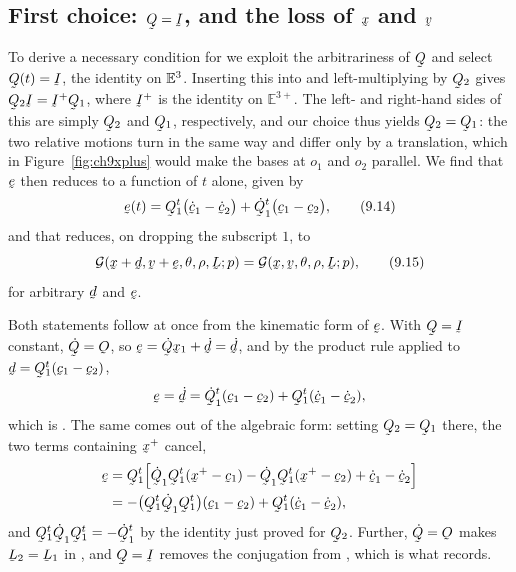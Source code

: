 \subsection*{First choice: $\bQ=\I$, and the loss of $\bx$ and $\bv$}

To derive a necessary condition for  we exploit the
arbitrariness of $\bQ$ and select $\bQ(t)=\I$, the identity on $\mathbb{E}^{3}$.
Inserting this into  and left-multiplying by $\bQ_{2}$ gives
$\bQ_{2}\I=\I^{+}\bQ_{1}$, where $\I^{+}$ is the identity on
$\mathbb{E}^{3+}$. The left- and right-hand sides of this are simply
$\bQ_{2}$ and $\bQ_{1}$, respectively, and our choice thus yields
$\bQ_{2}=\bQ_{1}$: the two relative motions turn in the same way and
differ only by a translation, which in Figure~\ref{fig:ch9xplus} would
make the bases at $o_{1}$ and $o_{2}$ parallel. We find that $\be$ then
reduces to a function of $t$ alone, given by
\begin{equation}
   \be(t)=\bQ_{1}^{t}\big(\dot\bc_{1}-\dot\bc_{2}\big)
   +\dot\bQ_{1}^{t}\big(\bc_{1}-\bc_{2}\big),
   \tag{9.14}\label{eq:9.14}
\end{equation}
and that  reduces, on dropping the subscript $1$, to
\begin{equation}
   \mathcal{G}(\bx+\bd,\bv+\be,\theta,\rho,\bL;p)
   =\mathcal{G}(\bx,\bv,\theta,\rho,\bL;p),
   \tag{9.15}\label{eq:9.15}
\end{equation}
for arbitrary $\bd$ and $\be$.

Both statements follow at once from the kinematic form of $\be$. With
$\bQ=\I$ constant, $\dot\bQ=\Ob$, so $\be=\dot\bQ\bx_{1}+\dot\bd
=\dot\bd$, and by the product rule applied to
$\bd=\bQ_{1}^{t}(\bc_{1}-\bc_{2})$,
\[
   \be=\dot\bd=\dot\bQ_{1}^{t}(\bc_{1}-\bc_{2})
   +\bQ_{1}^{t}(\dot\bc_{1}-\dot\bc_{2}),
\]
which is . The same comes out of the algebraic form: setting
$\bQ_{2}=\bQ_{1}$ there, the two terms containing $\bx^{+}$ cancel,
\[
\begin{aligned}
   \be&=\bQ_{1}^{t}\Big[\dot\bQ_{1}\bQ_{1}^{t}(\bx^{+}-\bc_{1})
       -\dot\bQ_{1}\bQ_{1}^{t}(\bx^{+}-\bc_{2})
       +\dot\bc_{1}-\dot\bc_{2}\Big]\\
      &=-\big(\bQ_{1}^{t}\dot\bQ_{1}\bQ_{1}^{t}\big)(\bc_{1}-\bc_{2})
       +\bQ_{1}^{t}(\dot\bc_{1}-\dot\bc_{2}),
\end{aligned}
\]
and $\bQ_{1}^{t}\dot\bQ_{1}\bQ_{1}^{t}=-\dot\bQ_{1}^{t}$ by the identity
just proved for $\bQ_{2}$. Further, $\dot\bQ=\Ob$ makes $\bL_{2}=\bL_{1}$
in , and $\bQ=\I$ removes the conjugation from ,
which is what  records.

